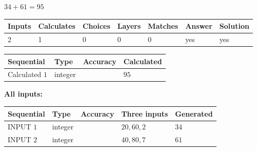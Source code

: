 \documentclass[12pt]{article}
\begin{document}
 

 
 
 
\noindent{}
 
 

$ %
34 +  %
61=   %
95$
 
 
\noindent{}
 
 

 
   
   
   
   
\noindent\begin{tabular}{|l|l|l|l|l|l|l|}
 \hline
Inputs & Calculates & Choices & Layers & Matches & Answer & Solution \\ \hline
 2  & 
 1  & 
 0
  & 
 0  & 
 0  & 
  yes & 
  yes 
  \\ \hline
 \end{tabular}
   
   
   
   
\noindent{}
   
   
  
  
\noindent\begin{tabular}{|l|l|l|l|}
\hline
 Sequential & Type & Accuracy & Calculated \\ 
\hline
 
 
  Calculated $  1 $ & integer &  & 
  $ 95 $ 
 \\  \hline  
 \end{tabular}
   
   
   
   
\noindent\vspace{0.1in}\hspace{-0.08in} {\textbf{\Large{All inputs: }}}
   
   
  
  
\noindent\begin{tabular}{|l|l|l|l|l|}
\hline
 Sequential & Type & Accuracy & Three inputs & Generated \\ 
\hline
 
 
  INPUT $  1 $ & integer &  & $
 20
 , 
 60
 , 
 2
 $ & $ 34 $ 
 \\  \hline  
 
 
  INPUT $  2 $ & integer &  & $
 40
 , 
 80
 , 
 7
 $ & $ 61 $ 
 \\  \hline  
 \end{tabular}
   
\end{document}

